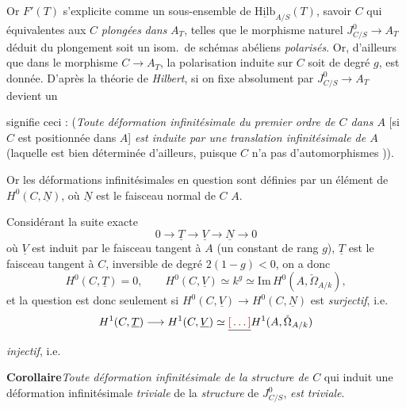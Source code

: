 \documentclass[11pt,a4paper]{article}
\begin{document}

Or $F'(T)$ s'explicite comme un sous-ensemble de
$\underline{\mathrm{Hilb}}_{A/S}(T)$, savoir \ill{} $C$ qui \ill{}
\ill{} équivalentes aux $C$ \emph{plongées} \emph{dans} \struck{\ill{}}
$A_{T}$, telles que le morphisme naturel $J^{0}_{C/S} \longrightarrow A_{T}$
déduit du plongement soit un isom.\ de schémas abéliens
 \add{\ill{}} \emph{polarisés}. Or,
 \ill{} d'ailleurs que dans le morphisme $C \to
A_{T}$,  la polarisation induite
sur $C$ soit de degré $g$, est donnée. D'après la théorie de \emph{Hilbert},
si on fixe absolument \ill{} \ill{} par $J^{0}_{C/S} \to A_{T}$ devient
\ill{} un


 signifie ceci : (\emph{Toute déformation
infinitésimale du premier ordre de $C$ dans $A$} [si $C$ est \ill{} \ill{}
positionnée dans $A$] \emph{est induite par une translation infinitésimale de
$A$} (laquelle est bien déterminée d'ailleurs, puisque $C$ n'a pas
d'automorphismes )).

Or  les déformations infinitésimales en question sont définies par
un élément de $H^{0}(C, \underline{N})$, où $\underline{N}$ est le faisceau
normal de $C$  $A$.

Considérant la suite exacte
\[
  0 \longrightarrow \underline{T} \longrightarrow \underline{V}
    \longrightarrow \underline{N} \longrightarrow 0
\]
où $\underline{V}$ est induit par le faisceau tangent à $A$ (un \ill{}
constant de rang $g$), $\underline{T}$ est le faisceau tangent à $C$,
\ill{} inversible de degré $2(1-g) < 0$,  on a donc
\[
  H^{0}(C, \underline{T}) = 0, \qquad
  H^{0}(C, \underline{V}) \simeq k^{g} \simeq
  \mathrm{Im}\, H^{0}(A, \check{\Omega}_{A/k}),
\]
et la question est donc seulement si $H^{0}(C, \underline{V}) \to H^{0}(C,
\underline{N})$ est \emph{surjectif}, i.e.
\[
  H^{1}(C, \underline{T}) \longrightarrow H^{1}(C, \underline{V})
  \simeq \struck{\ill{}} H^{1}(A, \check{\Omega}_{A/k})
\]
\emph{injectif}, i.e.


\textbf{Corollaire}\quad \emph{Toute déformation infinitésimale}  \emph{de la} \emph{structure de $C$} qui induit une déformation
infinitésimale \emph{triviale} de la \emph{structure} de $J^{0}_{C/S}$,
\emph{est triviale}.
\end{document}
